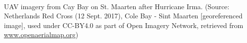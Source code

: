 \thispagestyle{empty}

\hfill
\vfill %


\begingroup
{}\\
\endgroup
UAV imagery from Cay Bay on St. Maarten after Hurricane Irma. (Source: Netherlands Red Cross (12 Sept. 2017), Cole Bay - Sint Maarten [georeferenced image], used under CC-BY4.0 as part of Open Imagery Network, retrieved from \url{www.openaerialmap.org})